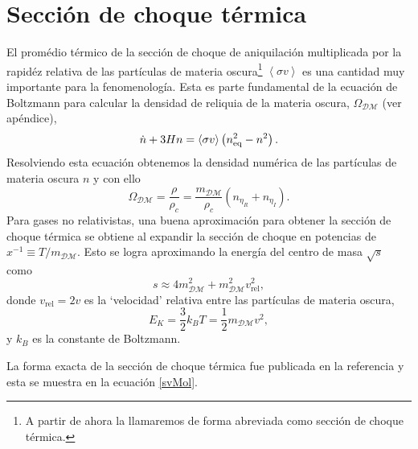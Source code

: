 \section[\hspace{-0.14in}Sección de choque térmica]{Sección de choque térmica}

El promédio térmico de la sección de choque de aniquilación multiplicada por la rapidéz relativa de las partículas de materia oscura\footnote{A partir de ahora la llamaremos de forma abreviada como sección de choque térmica.} $\left< \sigma v \right>$ es una cantidad muy importante para la fenomenología. Esta es parte fundamental de la ecuación de Boltzmann para calcular la densidad de reliquia de la materia oscura, $\Omega_{\mathcal{DM}}$ (ver apéndice),
\begin{equation}
\dot{n} + 3Hn = \langle \sigma v \rangle \left( n_{\rm eq}^2 - n^2 \right).
\end{equation}
Resolviendo esta ecuación obtenemos la densidad numérica de las partículas de materia oscura $n$ y con ello
\begin{equation}
\Omega_{\mathcal{DM}} = \frac{\rho}{\rho_c} = \frac{m_{\mathcal{DM}}}{\rho_c} \left(n_{\eta_R}+n_{\eta_I}\right).
\end{equation}
Para gases no relativistas, una buena aproximación para obtener la sección de choque térmica se obtiene al expandir la sección de choque en potencias de $x^{-1} \equiv T/m_{\mathcal{DM}}$. Esto se logra aproximando la energía del centro de masa $\sqrt{s}$ como
\begin{equation}
s \approx 4m_\mathcal{DM}^2+m_\mathcal{DM}^2 v_{\text{rel}}^2,
\end{equation}
donde $v_\text{rel}=2v$ es la `velocidad' relativa entre las partículas de materia oscura,
\begin{equation}
E_K = \frac{3}{2}k_BT = \frac{1}{2}m_\mathcal{DM} v^2,
\end{equation}
 y $k_B$ es la constante de Boltzmann.

La forma exacta de la sección de choque térmica fue publicada en la referencia \cite{gondolo1991cosmic} y esta se muestra en la ecuación \ref{svMol}.


